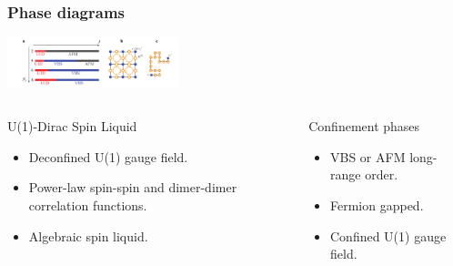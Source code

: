 \documentclass[xcolor=table, 10pt, aspectratio=169]{beamer}
\begin{document}
\begin{frame}
  \frametitle{Phase diagrams}
  \begin{center}
    \includegraphics[width=5cm]{phase-diagram}
  \end{center}
  \begin{columns}[t]
    \begin{block}{U(1)-Dirac Spin Liquid}
      \begin{itemize}
        \item Deconfined U(1) gauge field.
        \item Power-law spin-spin and dimer-dimer correlation functions.
        \item Algebraic spin liquid.
      \end{itemize}
    \end{block}

    \begin{block}{Confinement phases}
      \begin{itemize}
        \item VBS or AFM long-range order.
        \item Fermion gapped.
        \item Confined U(1) gauge field.
      \end{itemize}
    \end{block}
  \end{columns}
\end{frame}
\end{document}
